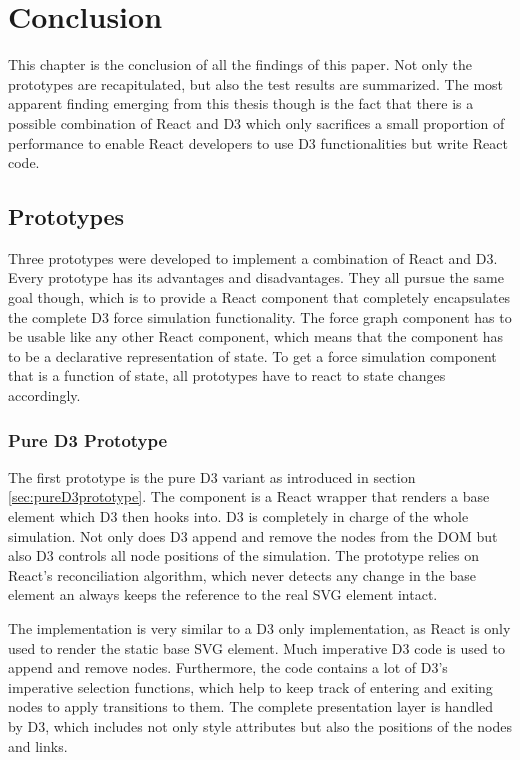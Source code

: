 \chapter{Conclusion}
\label{cha:conclusion}

This chapter is the conclusion of all the findings of this paper. Not only the prototypes are recapitulated, but also the test results are summarized. The most apparent finding emerging from this thesis though is the fact that there is a possible combination of React and D3 which only sacrifices a small proportion of performance to enable React developers to use D3 functionalities but write React code.

\section{Prototypes}

Three prototypes were developed to implement a combination of React and D3. Every prototype has its advantages and disadvantages. They all pursue the same goal though, which is to provide a React component that completely encapsulates the complete D3 force simulation functionality. The force graph component has to be usable like any other React component, which means that the component has to be a declarative representation of state. To get a force simulation component that is a function of state, all prototypes have to react to state changes accordingly.

\subsection{Pure D3 Prototype}

The first prototype is the pure D3 variant as introduced in section \ref{sec:pureD3prototype}. The component is a React wrapper that renders a base element which D3 then hooks into. D3 is completely in charge of the whole simulation. Not only does D3 append and remove the nodes from the DOM but also D3 controls all node positions of the simulation. The prototype relies on React's reconciliation algorithm, which never detects any change in the base element an always keeps the reference to the real SVG element intact.

The implementation is very similar to a D3 only implementation, as React is only used to render the static base SVG element. Much imperative D3 code is used to append and remove nodes. Furthermore, the code contains a lot of D3's imperative selection functions, which help to keep track of entering and exiting nodes to apply transitions to them. The complete presentation layer is handled by D3, which includes not only style attributes but also the positions of the nodes and links.

